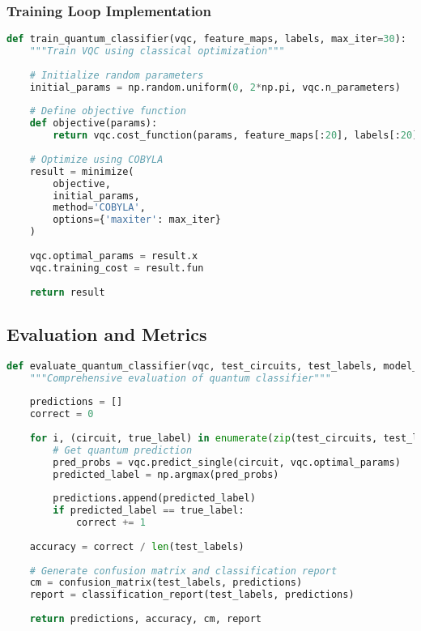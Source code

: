 \documentclass[11pt,a4paper]{article}
\begin{document}
\subsubsection{Training Loop Implementation}
\begin{lstlisting}[language=Python]
def train_quantum_classifier(vqc, feature_maps, labels, max_iter=30):
    """Train VQC using classical optimization"""
    
    # Initialize random parameters
    initial_params = np.random.uniform(0, 2*np.pi, vqc.n_parameters)
    
    # Define objective function
    def objective(params):
        return vqc.cost_function(params, feature_maps[:20], labels[:20])
    
    # Optimize using COBYLA
    result = minimize(
        objective, 
        initial_params, 
        method='COBYLA',
        options={'maxiter': max_iter}
    )
    
    vqc.optimal_params = result.x
    vqc.training_cost = result.fun
    
    return result
\end{lstlisting}

\subsection{Evaluation and Metrics}
\begin{lstlisting}[language=Python]
def evaluate_quantum_classifier(vqc, test_circuits, test_labels, model_name):
    """Comprehensive evaluation of quantum classifier"""
    
    predictions = []
    correct = 0
    
    for i, (circuit, true_label) in enumerate(zip(test_circuits, test_labels)):
        # Get quantum prediction
        pred_probs = vqc.predict_single(circuit, vqc.optimal_params)
        predicted_label = np.argmax(pred_probs)
        
        predictions.append(predicted_label)
        if predicted_label == true_label:
            correct += 1
    
    accuracy = correct / len(test_labels)
    
    # Generate confusion matrix and classification report
    cm = confusion_matrix(test_labels, predictions)
    report = classification_report(test_labels, predictions)
    
    return predictions, accuracy, cm, report
\end{lstlisting}
\end{document}
